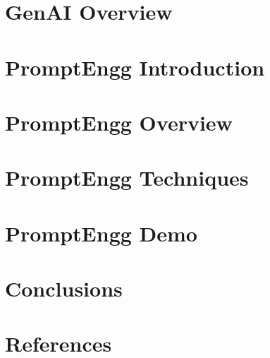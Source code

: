 \section[GenAI]{GenAI Overview}


\section[Intro]{PromptEngg Introduction}


\section[PromptEngg]{PromptEngg Overview}


\section[Techniques]{PromptEngg Techniques}


\section[Demo]{PromptEngg Demo}


\section[Concl]{Conclusions}


\section[Refs]{References}
